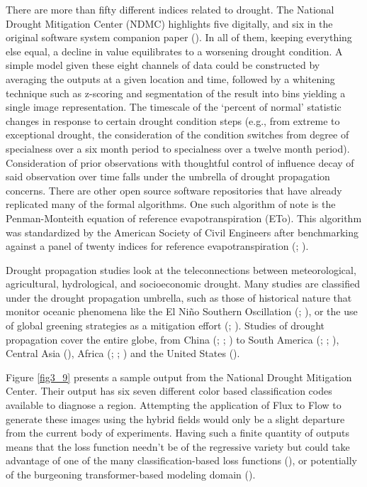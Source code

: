 \begin{refsection}
There are more than fifty different indices related to drought. The National Drought Mitigation Center (NDMC) highlights five digitally, and six in the original software system companion paper (\cite{svoboda2002drought}). In all of them, keeping everything else equal, a decline in value equilibrates to a worsening drought condition. A simple model given these eight channels of data could be constructed by averaging the outputs at a given location and time, followed by a whitening technique such as z-scoring and segmentation of the result into bins yielding a single image representation. The timescale of the ‘percent of normal’ statistic changes in response to certain drought condition steps (e.g., from extreme to exceptional drought, the consideration of the condition switches from degree of specialness over a six month period to specialness over a twelve month period). Consideration of prior observations with thoughtful control of influence decay of said observation over time falls under the umbrella of drought propagation concerns. There are other open source software repositories that have already replicated many of the formal algorithms. One such algorithm of note is the Penman-Monteith equation of reference evapotranspiration (ETo). This algorithm was standardized by the American Society of Civil Engineers after benchmarking against a panel of twenty indices for reference evapotranspiration (\cite{albano2022multidataset}; \cite{richards2019pyeto}).

Drought propagation studies look at the teleconnections between meteorological, agricultural, hydrological, and socioeconomic drought. Many studies are classified under the drought propagation umbrella, such as those of historical nature that monitor oceanic phenomena like the El Niño Southern Oscillation (\cite{piechota1996drought}; \cite{berenguer2021tracking}), or the use of global greening strategies as a mitigation effort (\cite{parungo1994gobi}; \cite{gadzama2017attenuation}). Studies of drought propagation cover the entire globe, from China (\cite{guo2021elucidating}; \cite{huang2021drought}; \cite{zhang2021agricultural}) to South America (\cite{berenguer2021tracking}; \cite{bevacqua2021spatial}; \cite{correia2022between}), Central Asia (\cite{ho2021new}), Africa (\cite{enqvist2019water}; \cite{walters2022learning}; \cite{gebrechorkos2022variability}) and the United States (\cite{apurv2020drought}). 

Figure \ref{fig3_9} presents a sample output from the National Drought Mitigation Center. Their output has six seven different color based classification codes available to diagnose a region. Attempting the application of Flux to Flow to generate these images using the hybrid fields would only be a slight departure from the current body of experiments. Having such a finite quantity of outputs means that the loss function needn’t be of the regressive variety but could take advantage of one of the many classification-based loss functions (\cite{janocha2017loss}), or potentially of the burgeoning transformer-based modeling domain (\cite{khan2022transformers}).


\end{refsection}
